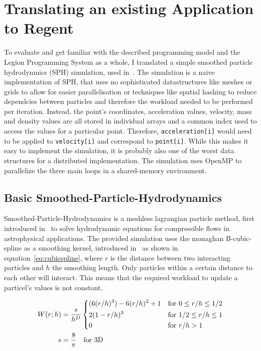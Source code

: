 \documentclass{article}      %
\begin{document}
\section{Translating an existing Application to Regent}

To evaluate and get familiar with the described programming model and the Legion Programming System as a whole, I translated a simple smoothed particle hydrodynmics (SPH) simulation, used in~\cite{DOKULIL2015}. The simulation is a naive implementation of SPH, that uses no sophisticated datastructures like meshes or grids to allow for easier parallelisation or techniques like spatial hashing to reduce dependcies between particles and therefore the workload needed to be performed per iteration. Instead, the point's coordinates, acceleration values, velocity, mass and density values are all stored in individual arrays and a common index used to access the values for a particular point. Therefore, \lstinline{acceleration[i]} would need to be applied to \lstinline{velocity[i]} and correspond to \lstinline{point[i]}. While this makes it easy to implement the simulation, it is probably also one of the worst data structures for a distributed implementation. The simulation uses OpenMP to parallelize the three main loops in a shared-memory environment.

\subsection{Basic Smoothed-Particle-Hydrodynamics}
Smoothed-Particle-Hydrodynamics is a meshless lagrangian particle method, first introduced in~\cite{gingold1977smoothed} to solve hydrodynamic equations for compressible flows in astrophysical applications. The provided simulation uses the monaghan B-cubic-spline as a smoothing kernel, introduced in~\cite{monaghan1985refined} as shown in equation~\ref{eq:cubicspline}, where $r$ is the distance between two interacting particles and $h$ the smoothing length. Only particles within a certain distance to each other will interact. This means that the required workload to update a particel's values is not constant. 

\begin{alignat}{2} 
	\label{eq:cubicspline}
	W(r;h) &= \frac{s}{h^D} 
		\begin{dcases}
			(6(r/h)^3)-6(r/h)^2+1 & \text{for } 0 \leq r/h \leq 1/2 \\
			2(1-r/h)^3 & \text{for } 1/2 \leq r/h \leq 1 \\
			0 & \text{for } r/h>1	
		\end{dcases} \\
	s &= \frac{8}{\pi} \quad \text{for 3D}
\end{alignat}
\end{document}
